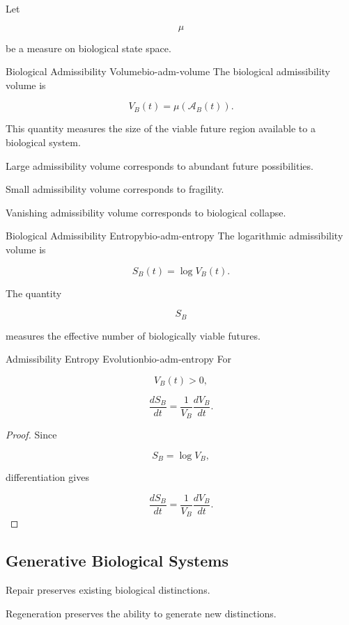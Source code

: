 \documentclass[12pt,twoside,openright]{book}
\begin{document}
Let

\[
\mu
\]

be a measure on biological state space.

\begin{definition}{Biological Admissibility Volume}{bio-adm-volume}
The biological admissibility volume is

\[
V_B(t)
=
\mu(\mathcal A_B(t)).
\]
\end{definition}

This quantity measures the size of the viable future
region available to a biological system.

Large admissibility volume corresponds to abundant future
possibilities.

Small admissibility volume corresponds to fragility.

Vanishing admissibility volume corresponds to biological
collapse.

\begin{definition}{Biological Admissibility Entropy}{bio-adm-entropy}
The logarithmic admissibility volume is

\[
S_B(t)
=
\log V_B(t).
\]
\end{definition}

The quantity

\[
S_B
\]

measures the effective number of biologically viable
futures.

\begin{proposition}{Admissibility Entropy Evolution}{bio-adm-entropy}
For

\[
V_B(t)>0,
\]

\[
\frac{dS_B}{dt}
=
\frac{1}{V_B}
\frac{dV_B}{dt}.
\]
\end{proposition}

\begin{proof}
Since

\[
S_B
=
\log V_B,
\]

differentiation gives

\[
\frac{dS_B}{dt}
=
\frac{1}{V_B}
\frac{dV_B}{dt}.
\]
\end{proof}

\subsection{Generative Biological Systems}

Repair preserves existing biological distinctions.

Regeneration preserves the ability to generate new
distinctions.
\end{document}
